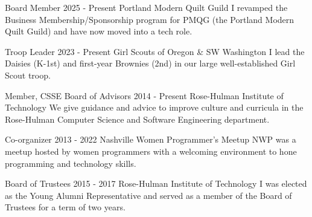 
\begin{cvcommunityinvolvemententries}
  \cvcommunityinvolvemententry
    {Board Member}
    {2025 - Present }
    {Portland Modern Quilt Guild}
    {I revamped the Business Membership/Sponsorship program for PMQG (the Portland Modern Quilt Guild) and have now moved into a tech role.}

  \cvcommunityinvolvemententry
    {Troop Leader}
    {2023 - Present}
    {Girl Scouts of Oregon \& SW Washington}
    {I lead the Daisies (K-1st) and first-year Brownies (2nd) in our large well-established Girl Scout troop.}

  \cvcommunityinvolvemententry
    {Member, CSSE Board of Advisors}
    {2014 - Present}
    {Rose-Hulman Institute of Technology}
    {We give guidance and advice to improve culture and curricula in the Rose-Hulman Computer Science and Software Engineering department.}

  \cvcommunityinvolvemententry
    {Co-organizer}
    {2013 - 2022}
    {Nashville Women Programmer's Meetup}
    {NWP was a meetup hosted by women programmers with a welcoming environment to hone programming and technology skills.}

  \cvcommunityinvolvemententry
    {Board of Trustees}
    {2015 - 2017}
    {Rose-Hulman Institute of Technology}
    {I was elected as the Young Alumni Representative and served as a member of the Board of Trustees for a term of two years.}


\end{cvcommunityinvolvemententries}
